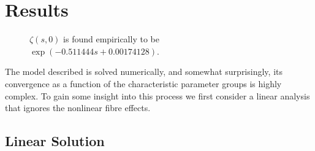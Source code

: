 \documentclass[12pt]{article}
\begin{document}
\section{Results}
\begin{wrapfigure}{r}{0.45\textwidth}
\vspace{-11mm}
\centering
{}
\caption{$\zeta(s, 0)$ is found empirically to be $\exp(-0.511444s + 0.00174128)$.}
\label{fig:zeta}
\end{wrapfigure}
The model described is solved numerically, and somewhat surprisingly, its convergence as a function of the characteristic parameter groups is highly complex. To gain some insight into this process we first consider a linear analysis that ignores the nonlinear fibre effects.

\subsection{Linear Solution}


\end{document}
